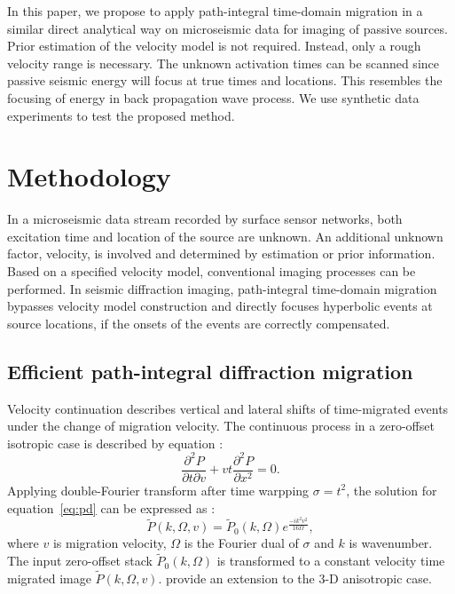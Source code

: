 In this paper, we propose to apply path-integral time-domain migration in a similar direct analytical way on microseismic data for imaging of passive sources.
Prior estimation of the velocity model is not required.
Instead, only a rough velocity range is necessary.
The unknown activation times can be scanned since passive seismic energy will focus at true times and locations.
This resembles the focusing of energy in back propagation wave process.
We use synthetic data experiments to test the proposed method.

\section{Methodology}
In a microseismic data stream recorded by surface sensor networks, both excitation time and location of the source are unknown.
An additional unknown factor, velocity, is involved and determined by estimation or prior information.
Based on a specified velocity model, conventional imaging processes can be performed.
In seismic diffraction imaging, path-integral time-domain migration \cite[]{burnett2011diffraction} bypasses velocity model construction and directly focuses hyperbolic events at source locations, if the onsets of the events are correctly compensated.

\subsection{Efficient path-integral diffraction migration}
Velocity continuation describes vertical and lateral shifts of time-migrated events under the change of migration velocity.
The continuous process in a zero-offset isotropic case is described by equation \cite[]{claerbout1986velocity,fomel2003velocity}:
\begin{equation}
\frac{\partial^2 P}{\partial t \partial v}
+ vt\frac{\partial^2 P}{\partial x^2} = 0.
\label{eq:pd}
\end{equation}
Applying double-Fourier transform after time warpping $\sigma=t^2$, the solution for equation~\ref{eq:pd} can be expressed as \cite[]{fomel2003time}:
\begin{equation}
\tilde P(k,\Omega,v) = \tilde P_0(k,\Omega)e^{\frac{-ik^2v^2}{16\Omega}},
\label{eq:sol}
\end{equation}
where $v$ is migration velocity, $\Omega$ is the Fourier dual of $\sigma$ and $k$ is wavenumber.
The input zero-offset stack $\tilde P_0(k,\Omega)$ is transformed to a constant velocity time migrated image $\tilde P(k,\Omega,v)$.
\cite{burnett2011azimuthally} provide an extension to the 3-D anisotropic case.

